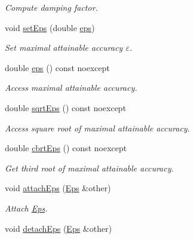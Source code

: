 \begin{DoxyCompactItemize}
\begin{DoxyCompactList}\small\item\em Compute damping factor. \end{DoxyCompactList}\item 
void \hyperlink{classSpacy_1_1Mixin_1_1Eps_a1bbfd62541610d5d80f2782ab77158e4_a1bbfd62541610d5d80f2782ab77158e4}{set\+Eps} (double \hyperlink{classSpacy_1_1Mixin_1_1Eps_a40e2ba8f3abd2b5370ef41238cfaaf8b_a40e2ba8f3abd2b5370ef41238cfaaf8b}{eps})
\begin{DoxyCompactList}\small\item\em Set maximal attainable accuracy $\varepsilon$. \end{DoxyCompactList}\item 
double \hyperlink{classSpacy_1_1Mixin_1_1Eps_a40e2ba8f3abd2b5370ef41238cfaaf8b_a40e2ba8f3abd2b5370ef41238cfaaf8b}{eps} () const noexcept
\begin{DoxyCompactList}\small\item\em Access maximal attainable accuracy. \end{DoxyCompactList}\item 
double \hyperlink{classSpacy_1_1Mixin_1_1Eps_a29e8c25dc3f1fdede57b8eb06f520fe1_a29e8c25dc3f1fdede57b8eb06f520fe1}{sqrt\+Eps} () const noexcept
\begin{DoxyCompactList}\small\item\em Access square root of maximal attainable accuracy. \end{DoxyCompactList}\item 
double \hyperlink{classSpacy_1_1Mixin_1_1Eps_a1879ebbf1b467cb4be36bcc63307018d_a1879ebbf1b467cb4be36bcc63307018d}{cbrt\+Eps} () const noexcept
\begin{DoxyCompactList}\small\item\em Get third root of maximal attainable accuracy. \end{DoxyCompactList}\item 
void \hyperlink{classSpacy_1_1Mixin_1_1Eps_af69cd3dee52e723302b21ca2a25f1192_af69cd3dee52e723302b21ca2a25f1192}{attach\+Eps} (\hyperlink{classSpacy_1_1Mixin_1_1Eps_a51dbe0b9cc950e0f3dfd34a481f08ae4_a51dbe0b9cc950e0f3dfd34a481f08ae4}{Eps} \&other)
\begin{DoxyCompactList}\small\item\em Attach \hyperlink{classSpacy_1_1Mixin_1_1Eps}{Eps}. \end{DoxyCompactList}\item 
\hypertarget{classSpacy_1_1Mixin_1_1Eps_ab49910e189cb86b6fd6f89b6f2af14cc}{}void \hyperlink{classSpacy_1_1Mixin_1_1Eps_ab49910e189cb86b6fd6f89b6f2af14cc}{detach\+Eps} (\hyperlink{classSpacy_1_1Mixin_1_1Eps_a51dbe0b9cc950e0f3dfd34a481f08ae4_a51dbe0b9cc950e0f3dfd34a481f08ae4}{Eps} \&other)\label{classSpacy_1_1Mixin_1_1Eps_ab49910e189cb86b6fd6f89b6f2af14cc}


\end{DoxyCompactItemize}

